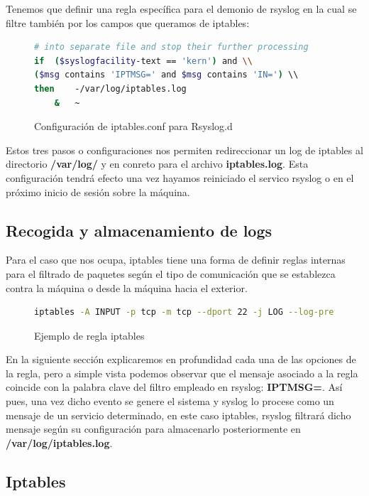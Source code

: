 Tenemos que definir una regla específica para el demonio de rsyslog en la cual se filtre también por los campos que queramos de iptables:

\begin{figure}[H]
\begin{lstlisting}[language=bash]
# into separate file and stop their further processing
if  ($syslogfacility-text == 'kern') and \\
($msg contains 'IPTMSG=' and $msg contains 'IN=') \\
then    -/var/log/iptables.log
    &   ~

\end{lstlisting}
\caption{Configuración de iptables.conf para Rsyslog.d}
\end{figure}

Estos tres pasos o configuraciones nos permiten redireccionar un log de iptables al directorio \textbf{/var/log/} y en conreto para el archivo \textbf{iptables.log}. Esta configuración tendrá efecto una vez hayamos reiniciado el servico rsyslog o en el próximo inicio de sesión sobre la máquina.

\pagebreak
\subsection[Logs]{Recogida y almacenamiento de logs}
Para el caso que nos ocupa, iptables tiene una forma de definir reglas internas para el filtrado de paquetes según el tipo de comunicación que se establezca contra la máquina o desde la máquina hacia el exterior.

\begin{figure}[H]
\begin{lstlisting}[language=bash]
iptables -A INPUT -p tcp -m tcp --dport 22 -j LOG --log-prefix "IPTMSG=Connection SSH "
\end{lstlisting}
\caption{Ejemplo de regla iptables}
\end{figure}

En la siguiente sección explicaremos en profundidad cada una de las opciones de la regla, pero a simple vista podemos observar que el mensaje asociado a la regla coincide con la palabra clave del filtro empleado en rsyslog: \textbf{IPTMSG=}. Así pues, una vez dicho evento se genere el sistema y syslog lo procese como un mensaje de un servicio determinado, en este caso iptables, rsyslog filtrará dicho mensaje según su configuración para almacenarlo posteriormente en \textbf{/var/log/iptables.log}.

\subsection{Iptables}

